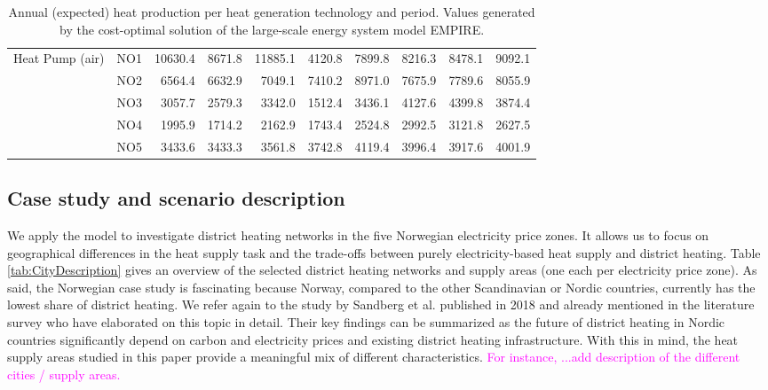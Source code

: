\begin{table}[h]
{\begin{tabular}{llrrrrrrrr}
			\multirow{5}{*}{Heat Pump (air)} & NO1 & 10630.4 & 8671.8 & 11885.1 & 4120.8 & 7899.8 & 8216.3 & 8478.1 & 9092.1\\
			& NO2 & 6564.4 & 6632.9 & 7049.1 & 7410.2 & 8971.0 & 7675.9 & 7789.6 & 8055.9\\
			& NO3 & 3057.7 & 2579.3 & 3342.0 & 1512.4 & 3436.1 & 4127.6 & 4399.8 & 3874.4\\
			& NO4 & 1995.9 & 1714.2 & 2162.9 & 1743.4 & 2524.8 & 2992.5 & 3121.8 & 2627.5\\
			& NO5 & 3433.6 & 3433.3 & 3561.8 & 3742.8 & 4119.4 & 3996.4 & 3917.6 & 4001.9\\		
			
			\bottomrule
	\end{tabular}}
	\caption{Annual (expected) heat production per heat generation technology and period. Values generated by the cost-optimal solution of the large-scale energy system model EMPIRE.}
	\label{tab:QuantityGen}
\end{table}


\subsection{Case study and scenario description}\label{Data}
We apply the model to investigate district heating networks in the five Norwegian electricity price zones. It allows us to focus on geographical differences in the heat supply task and the trade-offs between purely electricity-based heat supply and district heating. Table \ref{tab:CityDescription} gives an overview of the selected district heating networks and supply areas (one each per electricity price zone). As said, the Norwegian case study is fascinating because Norway, compared to the other Scandinavian or Nordic countries, currently has the lowest share of district heating. We refer again to the study by Sandberg et al. \cite{sandberg2018framework} published in 2018 and already mentioned in the literature survey who have elaborated on this topic in detail. Their key findings can be summarized as the future of district heating in Nordic countries significantly depend on carbon and electricity prices and existing district heating infrastructure. With this in mind, the heat supply areas studied in this paper provide a meaningful mix of different characteristics. \textcolor{magenta}{For instance, ...add description of the different cities / supply areas.} 


